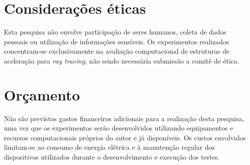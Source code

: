 \section{Considerações éticas}

Esta pesquisa não envolve participação de seres humanos, coleta de dados pessoais ou utilização de informações sensíveis. Os experimentos realizados concentram-se exclusivamente na avaliação computacional de estruturas de aceleração para \textit{ray tracing}, não sendo necessária submissão a comitê de ética.

\section{Orçamento}

Não são previstos gastos financeiros adicionais para a realização desta pesquisa, uma vez que os experimentos serão desenvolvidos utilizando equipamentos e recursos computacionais próprios do autor e já disponíveis. Os custos envolvidos limitam-se ao consumo de energia elétrica e à manutenção regular dos dispositivos utilizados durante o desenvolvimento e execução dos testes.